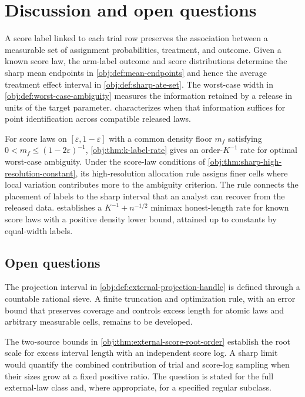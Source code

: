 \section{Discussion and open questions}

A score label linked to each trial row preserves the association between a measurable set of assignment probabilities, treatment, and outcome. Given a known score law, the arm-label outcome and score distributions determine the sharp mean endpoints in \cref{obj:def:mean-endpoints} and hence the average treatment effect interval in \cref{obj:def:sharp-ate-set}. The worst-case width in \cref{obj:def:worst-case-ambiguity} measures the information retained by a release in units of the target parameter.  characterizes when that information suffices for point identification across compatible released laws.

For score laws on \([\varepsilon,1-\varepsilon]\) with a common density floor \(m_f\) satisfying \(0<m_f\le(1-2\varepsilon)^{-1}\), \cref{obj:thm:k-label-rate} gives an order-\(K^{-1}\) rate for optimal worst-case ambiguity. Under the score-law conditions of \cref{obj:thm:sharp-high-resolution-constant}, its high-resolution allocation rule assigns finer cells where local variation contributes more to the ambiguity criterion. The rule connects the placement of labels to the sharp interval that an analyst can recover from the released data.  establishes a \(K^{-1}+n^{-1/2}\) minimax honest-length rate for known score laws with a positive density lower bound, attained up to constants by equal-width labels.

\subsection{Open questions}

The projection interval in \cref{obj:def:external-projection-handle} is defined through a countable rational sieve. A finite truncation and optimization rule, with an error bound that preserves coverage and controls excess length for atomic laws and arbitrary measurable cells, remains to be developed.

The two-source bounds in \cref{obj:thm:external-score-root-order} establish the root scale for excess interval length with an independent score log. A sharp limit would quantify the combined contribution of trial and score-log sampling when their sizes grow at a fixed positive ratio. The question is stated for the full external-law class and, where appropriate, for a specified regular subclass.

